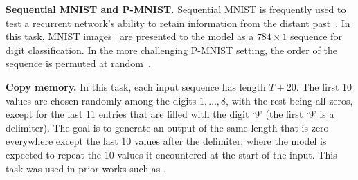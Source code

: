 \documentclass{article}
\newcommand\mypara[1]{\vspace{0mm}\noindent\textbf{#1}}
\begin{document}
\mypara{Sequential MNIST and P-MNIST.} Sequential MNIST is frequently used to
test a recurrent network's ability to retain information from the distant past~\citep{leIRNN,Zhang2016NIPS,wisdom2016full,cooijmans2016recurrent,kruegerZoneout,pmlr-v70-jing17a}.
In this task, MNIST images~\citep{Lecun98gradient} are presented to the
model as a $784 \!\times\! 1$ sequence for digit classification. In the more
challenging P-MNIST setting, the order of the sequence is permuted at random~\cite{leIRNN,arjovsky2016unitary,wisdom2016full,kruegerZoneout}.

\mypara{Copy memory.} In this task, each input sequence has length
$T+20$. The first 10 values are chosen randomly among the digits ${1,\ldots,8}$, with the rest
being all zeros, except for the last 11 entries that are filled with the digit `9' (the
first `9' is a delimiter). The goal is to generate an output of
the same length that is zero everywhere except the last 10 values after the
delimiter, where the model is expected to repeat the 10 values it encountered at the
start of the input. This task was used in prior works such as
\citet{Zhang2016NIPS,arjovsky2016unitary,wisdom2016full,pmlr-v70-jing17a}.
\end{document}
